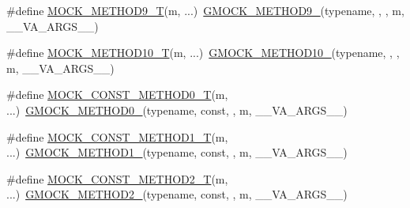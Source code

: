 \begin{DoxyCompactItemize}
\item 
\#define \mbox{\hyperlink{_obj__test_2lib_2googletest-release-1_88_81_2googlemock_2include_2gmock_2gmock-generated-function-mockers_8h_a838c68cbdf422cfc703b83daf1d1f1e1}{M\+O\+C\+K\+\_\+\+M\+E\+T\+H\+O\+D9\+\_\+T}}(m, ...)~\mbox{\hyperlink{_obj__test_2lib_2googletest-release-1_88_81_2googlemock_2include_2gmock_2gmock-generated-function-mockers_8h_aa820171a19cc587c247dbe05cbffc55f}{G\+M\+O\+C\+K\+\_\+\+M\+E\+T\+H\+O\+D9\+\_\+}}(typename, , , m, \+\_\+\+\_\+\+V\+A\+\_\+\+A\+R\+G\+S\+\_\+\+\_\+)
\item 
\#define \mbox{\hyperlink{_obj__test_2lib_2googletest-release-1_88_81_2googlemock_2include_2gmock_2gmock-generated-function-mockers_8h_aa28723ba52933b5ea9a4ffa1a73d15e1}{M\+O\+C\+K\+\_\+\+M\+E\+T\+H\+O\+D10\+\_\+T}}(m, ...)~\mbox{\hyperlink{_obj__test_2lib_2googletest-release-1_88_81_2googlemock_2include_2gmock_2gmock-generated-function-mockers_8h_a81a48223a8771de36ef92ac6d56f6e81}{G\+M\+O\+C\+K\+\_\+\+M\+E\+T\+H\+O\+D10\+\_\+}}(typename, , , m, \+\_\+\+\_\+\+V\+A\+\_\+\+A\+R\+G\+S\+\_\+\+\_\+)
\item 
\#define \mbox{\hyperlink{_obj__test_2lib_2googletest-release-1_88_81_2googlemock_2include_2gmock_2gmock-generated-function-mockers_8h_a5fc82f3de9d5e83b0a6bb6cda98a8887}{M\+O\+C\+K\+\_\+\+C\+O\+N\+S\+T\+\_\+\+M\+E\+T\+H\+O\+D0\+\_\+T}}(m, ...)~\mbox{\hyperlink{_obj__test_2lib_2googletest-release-1_88_81_2googlemock_2include_2gmock_2gmock-generated-function-mockers_8h_ae0d290ffa58d7c624b2e3487ba1252f4}{G\+M\+O\+C\+K\+\_\+\+M\+E\+T\+H\+O\+D0\+\_\+}}(typename, const, , m, \+\_\+\+\_\+\+V\+A\+\_\+\+A\+R\+G\+S\+\_\+\+\_\+)
\item 
\#define \mbox{\hyperlink{_obj__test_2lib_2googletest-release-1_88_81_2googlemock_2include_2gmock_2gmock-generated-function-mockers_8h_a46dfe8631eee86b15a79aff8a2866621}{M\+O\+C\+K\+\_\+\+C\+O\+N\+S\+T\+\_\+\+M\+E\+T\+H\+O\+D1\+\_\+T}}(m, ...)~\mbox{\hyperlink{_obj__test_2lib_2googletest-release-1_88_81_2googlemock_2include_2gmock_2gmock-generated-function-mockers_8h_a1bc0012d62440dda77208dabdf4925c9}{G\+M\+O\+C\+K\+\_\+\+M\+E\+T\+H\+O\+D1\+\_\+}}(typename, const, , m, \+\_\+\+\_\+\+V\+A\+\_\+\+A\+R\+G\+S\+\_\+\+\_\+)
\item 
\#define \mbox{\hyperlink{_obj__test_2lib_2googletest-release-1_88_81_2googlemock_2include_2gmock_2gmock-generated-function-mockers_8h_a4337d7257aa4edff048aa406073b718b}{M\+O\+C\+K\+\_\+\+C\+O\+N\+S\+T\+\_\+\+M\+E\+T\+H\+O\+D2\+\_\+T}}(m, ...)~\mbox{\hyperlink{_obj__test_2lib_2googletest-release-1_88_81_2googlemock_2include_2gmock_2gmock-generated-function-mockers_8h_a885295ca6bebb15efb3fc786218c5d47}{G\+M\+O\+C\+K\+\_\+\+M\+E\+T\+H\+O\+D2\+\_\+}}(typename, const, , m, \+\_\+\+\_\+\+V\+A\+\_\+\+A\+R\+G\+S\+\_\+\+\_\+)

\end{DoxyCompactItemize}
